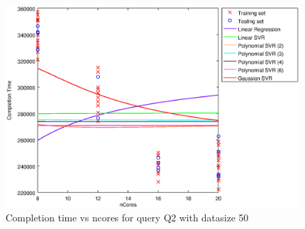 
\begin {figure}[hbtp]
\centering
\includegraphics[width=\textwidth]{output/Q2_50_ALL_WITH_1_OVER_NCORES/plot_Q2_50.eps}
\caption{Completion time vs ncores for query Q2 with datasize 50}
\label{fig:all_linear_Q2_50}
\end {figure}
